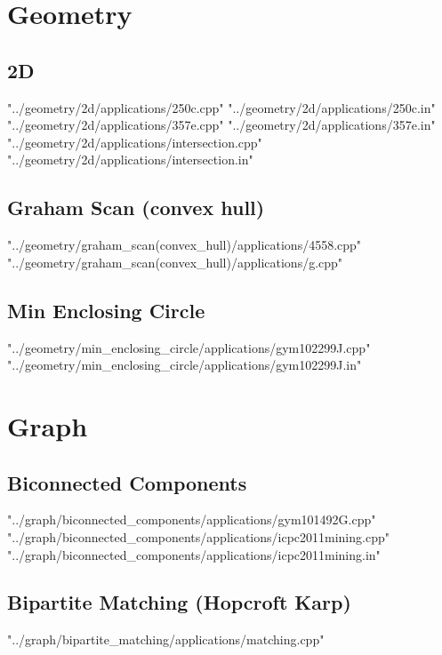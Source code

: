 \documentclass [12pt,onecolumn,oneside]{article}
\begin{document}
\newpage

\section{Geometry}
\subsection{ 2D}
 {"../geometry/2d/applications/250c.cpp"}
 {"../geometry/2d/applications/250c.in"}
 {"../geometry/2d/applications/357e.cpp"}
 {"../geometry/2d/applications/357e.in"}
 {"../geometry/2d/applications/intersection.cpp"}
 {"../geometry/2d/applications/intersection.in"}
\subsection{ Graham Scan (convex hull)}
 {"../geometry/graham_scan(convex_hull)/applications/4558.cpp"}
 {"../geometry/graham_scan(convex_hull)/applications/g.cpp"}
\subsection{ Min Enclosing Circle}
 {"../geometry/min_enclosing_circle/applications/gym102299J.cpp"}
 {"../geometry/min_enclosing_circle/applications/gym102299J.in"}
\newpage

\section{Graph}
\subsection{ Biconnected Components}
 {"../graph/biconnected_components/applications/gym101492G.cpp"}
 {"../graph/biconnected_components/applications/icpc2011mining.cpp"}
 {"../graph/biconnected_components/applications/icpc2011mining.in"}
\subsection{ Bipartite Matching (Hopcroft Karp)}
 {"../graph/bipartite_matching/applications/matching.cpp"}
\end{document}

